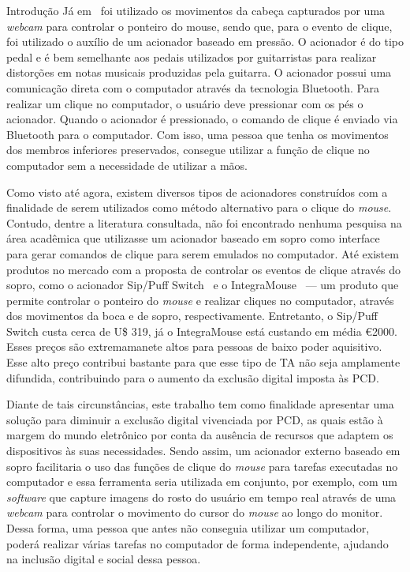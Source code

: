 \begin{chapter}{Introdução}
Já em~\cite{Antunes16} foi utilizado os movimentos da cabeça capturados por uma 
\textit{webcam} para controlar o ponteiro do mouse, sendo que, para o evento de
clique, foi utilizado o auxílio de um acionador baseado em pressão. O acionador
é do tipo pedal e é bem semelhante aos pedais utilizados por guitarristas para
realizar distorções em notas musicais produzidas pela guitarra. O acionador
possui uma comunicação direta com o computador através da tecnologia Bluetooth.
Para realizar um clique no computador, o usuário deve pressionar com
os pés o acionador. Quando o acionador é pressionado, o comando de clique é
enviado via Bluetooth para o computador.  Com isso, uma pessoa que tenha os
movimentos dos membros inferiores preservados, consegue utilizar a função de
clique no computador sem a necessidade de utilizar a mãos. 

Como visto até agora, existem diversos tipos de acionadores construídos com a
finalidade de serem utilizados como método alternativo para o clique do
\textit{mouse}.  Contudo, dentre a literatura consultada, não foi encontrado
nenhuma pesquisa na área acadêmica que utilizasse um acionador baseado em sopro
como interface para gerar comandos de clique para serem emulados no computador.
Até existem produtos no mercado com a proposta de controlar os eventos de
clique através do sopro, como o acionador Sip/Puff Switch~\cite{SipPuff} e o
IntegraMouse~\cite{IntegraMouse} --- um produto que permite controlar o ponteiro do
\textit{mouse} e realizar cliques no computador, através dos movimentos da boca
e de sopro, respectivamente. Entretanto, o Sip/Puff Switch custa cerca
de U\$ 319, já o IntegraMouse está custando em média \euro 2000. Esses preços
são extremamanete altos para pessoas de baixo poder aquisitivo. Esse alto preço
contribui bastante para que esse tipo de TA não seja
amplamente difundida, contribuindo para o aumento da exclusão digital imposta às
PCD.

Diante de tais circunstâncias, este trabalho tem como finalidade apresentar  uma
solução para diminuir a exclusão digital vivenciada por PCD, as quais estão à
margem do mundo eletrônico por conta da ausência de recursos que adaptem os
dispositivos às suas necessidades. Sendo assim, um acionador externo baseado em
sopro facilitaria o uso das funções de clique do \textit{mouse} para tarefas
executadas no computador e essa ferramenta seria utilizada em conjunto, por
exemplo, com um \textit{software} que capture imagens do rosto do usuário em
tempo real através de uma \textit{webcam} para controlar o movimento do cursor
do \textit{mouse} ao longo do monitor. Dessa forma, uma pessoa que antes não
conseguia utilizar um computador, poderá realizar várias tarefas no computador
de forma independente, ajudando na inclusão digital e social dessa pessoa.


\end{chapter}
